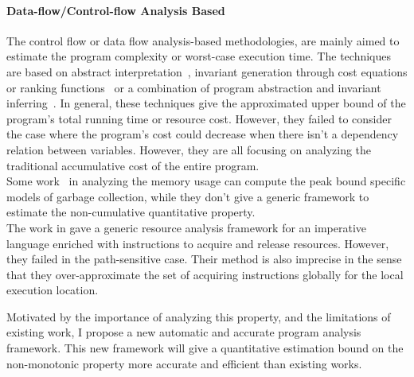 {\paragraph*{Data-flow/Control-flow Analysis Based}
The control flow or data flow analysis-based methodologies,
are mainly aimed to estimate the program complexity or worst-case execution time. 
The techniques are based on
abstract interpretation~\cite{GustafssonEL05, HumenbergerJK18},
invariant generation through cost equations or ranking functions~\cite{BrockschmidtEFFG16,AlbertAGP08,AliasDFG10,Flores-MontoyaH14}
or a combination of program abstraction and invariant inferring~\cite{GulwaniZ10, SinnZV17, GulwaniJK09}.
In general, these techniques give the approximated upper bound of the program's total running time or resource cost.
However, they failed to consider the case where the program's cost could decrease when there isn't a dependency relation between variables.
However, they are all focusing on analyzing the traditional accumulative cost of the entire program. 
\\
Some work~\cite{AlbertFR14, BrabermanGHY14, HofmannJ03} in analyzing the memory usage can compute the peak bound specific models of garbage collection,
while they don't give a generic framework to estimate the non-cumulative quantitative property.
\\
The work in \cite{AlbertFR15} gave a generic resource analysis framework for an imperative language enriched with instructions to acquire and release resources. 
However, they failed in the path-sensitive case. Their method is also imprecise in the sense that they over-approximate the
set of acquiring instructions globally for the local execution location.
}
Motivated by the importance of analyzing this property, and the limitations of existing work, I propose a new
automatic and accurate program analysis framework.
This new framework will give
a quantitative estimation bound on the non-monotonic property more accurate and efficient
than existing works.

